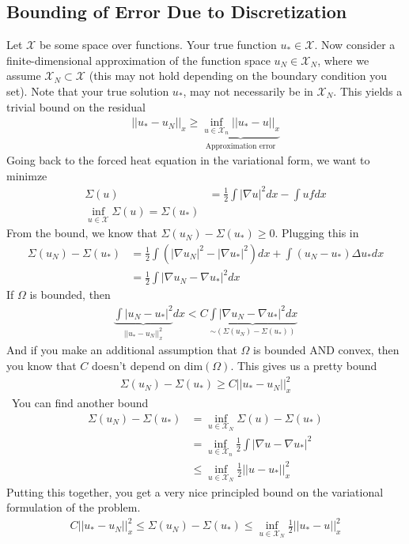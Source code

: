 \subsection{Bounding of Error Due to Discretization}
Let $\mathcal X$ be some space over functions. Your true function $u_* \in \mathcal X$. Now consider a finite-dimensional approximation of the function space $u_N \in \mathcal X_N$, where we assume $\mathcal X_N \subset \mathcal X$ (this may not hold depending on the boundary condition you set). Note that your true solution $u_*$, may not necessarily be in $\mathcal X_N$. This yields a trivial bound on the residual
\begin{align}
	||u_* - u_N||_{x} \geq \underbrace{\inf_{u \in \mathcal X_n} ||u_* - u||_x}_{\text{Approximation error}}
\end{align}
Going back to the forced heat equation in the variational form, we want to minimze
\begin{align}
	\Sigma(u) & = \frac{1}{2} \int |\nabla u |^2 dx - \int u f dx\\
	\inf_{u \in \mathcal X} \Sigma(u) = \Sigma(u_*)
\end{align}
From the bound, we know that $\Sigma(u_N)  - \Sigma(u_*)\geq  0$. Plugging this in
\begin{align}
	\Sigma(u_N) - \Sigma(u_*) & = \frac{1}{2} \int( |\nabla u_N|^2 - |\nabla u_*|^2 ) dx + \int (u_N - u_*) \Delta u_* dx\\
	& = \frac{1}{2} \int |\nabla u_N - \nabla u_*|^2 dx
\end{align}
If $\Omega$ is bounded, then
\begin{align}
	\underbrace{\int |u_N - u_*|^2}_{||u_* - u_N||^2_x} dx < C \underbrace{\int |\nabla u_N - \nabla u_*|^2 dx}_{\sim (\Sigma(u_N) - \Sigma(u_*))}
\end{align}
And if you make an additional assumption that $\Omega$ is bounded AND convex, then you know that $C$ doesn't depend on $\text{dim}(\Omega)$. This gives us a pretty bound
\begin{align}
	\Sigma(u_N) - \Sigma(u_*) \geq  C || u_* - u_N||^2_x
\end{align}\
You can find another bound
\begin{align}
	\Sigma(u_N) - \Sigma(u_*) & = \inf_{u \in \mathcal X_N} \Sigma(u) - \Sigma(u_*)\\
	& = \inf_{u \in \mathcal X_n} \frac{1}{2} \int |\nabla u - \nabla u_*|^2\\
	& \leq \inf_{u \in \mathcal X_N} \frac{1}{2} || u - u_* ||^2_x
\end{align}
Putting this together, you get a very nice principled bound on the variational formulation of the problem.
\begin{align}
	\boxed{C || u_* - u_N||^2_x \leq \Sigma(u_N) - \Sigma(u_*) \leq \inf_{u \in \mathcal X_N} \frac{1}{2} || u_* - u ||^2_x}
\end{align}


